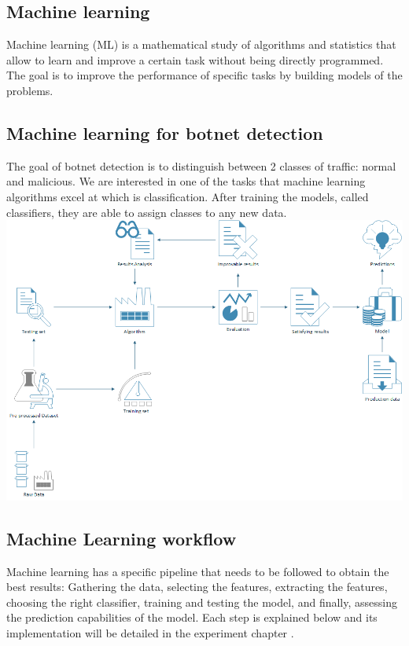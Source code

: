 \subsection{Machine learning}
Machine learning (ML) is a mathematical study of algorithms and statistics that allow to learn and improve a certain task without being directly programmed. The goal is to improve the performance of specific tasks by building models of the problems. \cite{ml-def}

\subsection{Machine learning for botnet detection}
The goal of botnet detection is to distinguish between 2 classes of traffic: normal and malicious. We are interested in one of the tasks that machine learning algorithms excel at which is classification. After training the models, called classifiers, they are able to assign classes to any new data.
\\
\includegraphics[scale=.4]{img/pers_ml_workflow.png}

\subsection{Machine Learning workflow}
Machine learning has a specific pipeline that needs to be followed to obtain the best results\cite{ml-workflow}: Gathering the data, selecting the features, extracting the features, choosing the right classifier, training and testing the model, and finally, assessing the prediction capabilities of the model. Each step is explained below and its implementation will be detailed in the experiment chapter \label{experiment}.

